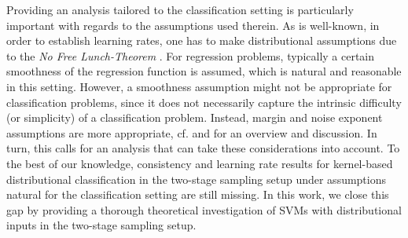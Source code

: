 \documentclass[letterpaper]{article} %
\begin{document}
Providing an analysis tailored to the classification setting is particularly important with regards to the assumptions used therein.
As is well-known, in order to establish learning rates, one has to make distributional assumptions due to the \emph{No Free Lunch-Theorem} \cite[Chapter~6]{SC08}.
For regression problems, typically a certain smoothness of the regression function is assumed, which is natural and reasonable in this setting. 
However, a smoothness assumption might not be appropriate for classification problems, since it does not necessarily capture the intrinsic difficulty (or simplicity) of a classification problem.
Instead, margin and noise exponent assumptions are more appropriate, cf. \cite{steinwart2007fast} and \cite[Chapter~8]{SC08} for an overview and discussion.
In turn, this calls for an analysis that can take these considerations into account.
To the best of our knowledge, consistency and learning rate results for kernel-based distributional classification in the two-stage sampling setup under assumptions natural for the classification setting are still missing.
In this work, we close this gap by providing a thorough theoretical investigation of SVMs with distributional inputs in the two-stage sampling setup.
\end{document}
